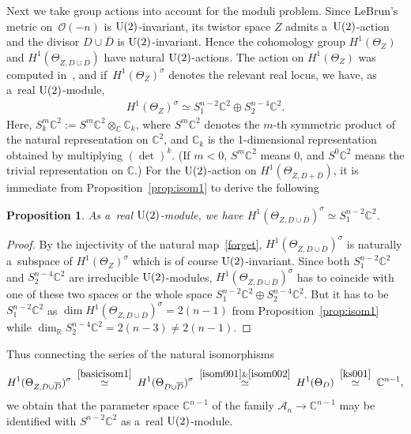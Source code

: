 \documentclass[pdftex]{sigma}
\numberwithin{equation}{section}
\newtheorem{Proposition}[Theorem]{Proposition}
{\theoremstyle{definition}
\newtheorem{Definition}[Theorem]{Definition}
\newtheorem{Remark}[Theorem]{Remark}
}
\begin{document}
Next we take group actions into account for the moduli problem.
Since LeBrun's metric on~$\mathscr O(-n)$ is ${\rm{U}}(2)$-invariant, its twistor space $Z$ admits
a~${\rm{U}}(2)$-action and the divisor $D\cup\overline D$ is ${\rm{U}}(2)$-invariant.
Hence the cohomology group $H^1(\Theta_Z)$ and $H^1(\Theta_{Z,D\cup\overline D})$ have natural ${\rm{U}}(2)$-actions.
The action on $H^1(\Theta_Z)$ was computed in~\cite{HonCMP2}, and if~$H^1(\Theta_Z)^{\sigma}$ denotes the relevant real
locus, we have, as a~real ${\rm{U}}(2)$-module,
\begin{gather*}%
H^1(\Theta_Z)^{\sigma}\simeq S^{n-2}_1\mathbb{C}^2 \oplus S^{n-4}_2\mathbb{C}^2.
\end{gather*}
Here, $S^m_k\mathbb{C}^2:= S^m\mathbb{C}^2\otimes_{\mathbb{C}}\mathbb{C}_k$, where $S^m\mathbb{C}^2$ denotes the $m$-th
symmetric product of the natural representation on $\mathbb{C}^2$, and $\mathbb{C}_k$ is the 1-dimensional
representation obtained by multiplying $(\det)^k$.
(If $m < 0$, $S^m\mathbb{C}^2$ means $0$, and $S^0\mathbb{C}^2$ means the trivial representation on $\mathbb{C}$.) For
the ${\rm{U}}(2)$-action on $H^1(\Theta_{Z,D+\overline D})$, it is immediate from Proposition~\ref{prop:isom1} to derive
the following

\begin{Proposition}
As a~real ${\rm{U}}(2)$-module, we have $H^1(\Theta_{Z,D\cup\overline D})^{\sigma} \simeq S^{n-2}_1\mathbb{C}^2$.
\end{Proposition}

\begin{proof}
By the injectivity of the natural map~\eqref{forget}, $H^1(\Theta_{Z,D\cup\overline D})^{\sigma}$ is naturally
a~subspace of $H^1(\Theta_{Z})^{\sigma}$ which is of course ${\rm{U}}(2)$-invariant.
Since both $S^{n-2}_1\mathbb{C}^2 $ and $S^{n-4}_2\mathbb{C}^2$ are irreducible ${\rm{U}}(2)$-modules,
$H^1(\Theta_{Z,D\cup\overline D})^{\sigma}$ has to coincide with one of these two spaces or the whole space
$S^{n-2}_1\mathbb{C}^2 \oplus S^{n-4}_2\mathbb{C}^2$.
But it has to be $S^{n-2}_1\mathbb{C}^2$ as $\dim H^1(\Theta_{Z,D\cup\overline D})^{\sigma}=2(n-1)$ from
Proposition~\ref{prop:isom1} while $\dim_{\mathbb{R}}S_2^{n-4}\mathbb{C}^2 = 2(n-3)\neq 2(n-1)$.
\end{proof}

Thus connecting the series of the natural isomorphisms
\begin{gather}
\label{isom49}
H^1(\Theta_{Z,D\cup\overline D})^{\sigma}
\; \stackrel{\eqref{basicisom1}}{\simeq}
\;
H^1(\Theta_{D\cup\overline D})^{\sigma}
\; \stackrel{\eqref{isom001}\&\eqref{isom002}}{\simeq}
\;
H^1(\Theta_D)
\;\stackrel{\eqref{ks001}}{\simeq}
\;
\mathbb{C}^{n-1},
\end{gather}
we obtain that the parameter space $\mathbb{C}^{n-1}$ of the family $\mathscr A_n\to\mathbb{C}^{n-1}$ may be
identif\/ied with $S^{n-2}\mathbb{C}^2$ as a~real ${\rm{U}}(2)$-module.
\end{document}

